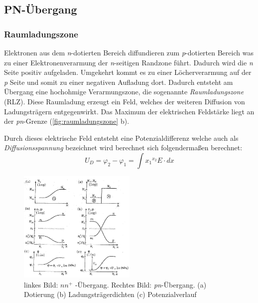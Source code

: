 
\subsection{PN-Übergang }\label{k5:pn}
    
    \subsubsection{Raumladungszone}
	Elektronen aus dem \textit{n}-dotierten Bereich diffundieren zum \textit{p}-dotierten Bereich was zu einer Elektronenverarmung der \textit{n}-seitigen Randzone führt. 
	Dadurch wird die \textit{n} Seite positiv aufgeladen. Umgekehrt kommt es zu einer Löcherverarmung auf der \textit{p} Seite und somit zu einer negativen Aufladung dort. 
    Dadurch entsteht am Übergang eine hochohmige Verarmungszone, die sogenannte \textit{Raumladungszone} (RLZ).
    Diese Raumladung erzeugt ein Feld, welches der weiteren Diffusion von Ladungsträgern entgegenwirkt. Das Maximum der elektrischen Feldstärke liegt an der \textit{pn}-Grenze (\ref{fig:raumladungszone} b).
    
    Durch dieses elektrische Feld entsteht eine Potenzialdifferenz welche auch als \textit{Diffusionsspannung} bezeichnet wird berechnet sich folgendermaßen berechnet:
    \begin{equation}
        U_D = \varphi_2 - \varphi_1 = \int{x_1}^{x_2} E \cdot dx
    \end{equation}

           \begin{figure}[H]
        \centering
        \includegraphics[width=0.5\textwidth]{fig/pnuebergang.jpg}
        \caption{linkes Bild: $nn^+$ -Übergang. Rechtes Bild: \textit{pn}-Übergang. (a) Dotierung (b) Ladungsträgerdichten (c) Potenzialverlauf}
        \label{fig:pnuebergang}
    \end{figure}
    

